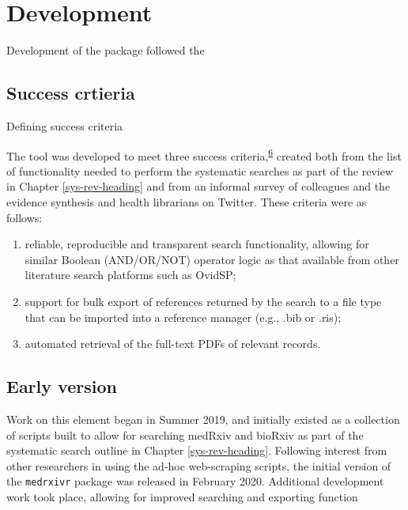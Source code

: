 \documentclass[a4paper, twoside]{templates/ociamthesis}
\providecommand{\tightlist}{%
  \setlength{\itemsep}{0pt}\setlength{\parskip}{0pt}}
\begin{document}
\hypertarget{development}{%
\section{Development}\label{development}}

Development of the package followed the

\hypertarget{success-crtieria}{%
\subsection{Success crtieria}\label{success-crtieria}}

Defining success criteria

The tool was developed to meet three success criteria,\textsuperscript{\protect\hyperlink{ref-wateridge1995}{6}} created both from the list of functionality needed to perform the systematic searches as part of the review in Chapter \ref{sys-rev-heading} and from an informal survey of colleagues and the evidence synthesis and health librarians on Twitter. These criteria were as follows:

\begin{enumerate}
\def\labelenumi{\arabic{enumi}.}
\tightlist
\item
  reliable, reproducible and transparent search functionality, allowing for similar Boolean (AND/OR/NOT) operator logic as that available from other literature search platforms such as OvidSP;\\
\item
  support for bulk export of references returned by the search to a file type that can be imported into a reference manager (e.g., .bib or .ris);\\
\item
  automated retrieval of the full-text PDFs of relevant records.
\end{enumerate}

\hypertarget{early-version}{%
\subsection{Early version}\label{early-version}}

Work on this element began in Summer 2019, and initially existed as a collection of scripts built to allow for searching medRxiv and bioRxiv as part of the systematic search outline in Chapter \ref{sys-rev-heading}. Following interest from other researchers in using the ad-hoc web-scraping scripts, the initial version of the \texttt{medrxivr} package was released in February 2020. Additional development work took place, allowing for improved searching and exporting function
\end{document}
